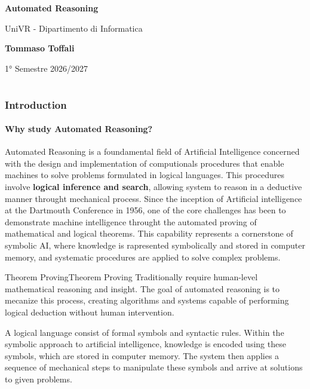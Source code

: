 \documentclass[a4paper]{article}
\theoremstyle{definition}
\begin{document}
\begin{titlepage}
	\begin{center}
		\vspace*{1cm}

		\Huge
		\textbf{Automated Reasoning}

		\vspace{0.5cm}
		\LARGE
		UniVR - Dipartimento di Informatica

		\vspace{1.5cm}

		\textbf{Tommaso Toffali}

		\vfill


		\vspace{0.8cm}


		1° Semestre 2026/2027
    \end{center}
\end{titlepage}

\tableofcontents
\pagebreak
\part{}
\section{Introduction}
\subsection{Why study Automated Reasoning?}
Automated Reasoning is a foundamental field of Artificial Intelligence concerned with the design
and implementation of computionals procedures that enable machines to solve problems formulated in logical
languages. This procedures involve \textbf{logical inference and search}, allowing system to reason
in a deductive manner throught mechanical process.
\vspace{1em}
\noindent
\newline
Since the inception of Artificial intelligence at the Dartmouth Conference in 1956, one of the core challenges
has been to demonstrate machine intelligence throught the automated proving of mathematical and logical theorems.
This capability represents a cornerstone of symbolic AI, where knowledge is rapresented symbolically and 
stored in computer memory, and systematic procedures are applied to solve complex problems.

\begin{theorem}{Theorem Proving}{Theorem Proving}
    Traditionally require human-level mathematical reasoning and insight. The goal of automated 
    reasoning is to mecanize this process, creating algorithms and systems capable of performing 
    logical deduction without human intervention.
\end{theorem}
\noindent
A logical language consist of formal symbols and syntactic rules. Within the symbolic approach to 
artificial intelligence, knowledge is encoded using these symbols, which are stored in computer memory.
The system then applies a sequence of mechanical steps to manipulate these symbols and arrive at solutions
to given problems.
\end{document}
